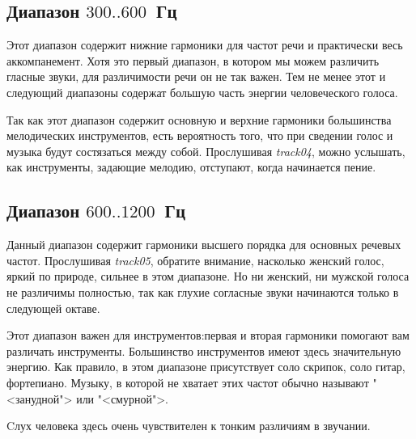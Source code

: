 \documentclass{beamer}
\begin{document}
\subsection{Диапазон $300..600$~Гц}
\begin{frame}
Этот диапазон содержит нижние гармоники для частот речи и практически весь аккомпанемент. Хотя это первый диапазон, в котором мы можем различить гласные звуки, для различимости речи он не так важен. Тем не менее этот и следующий диапазоны содержат большую часть энергии человеческого голоса.

Так как этот диапазон содержит основную и верхние гармоники большинства мелодических инструментов, есть вероятность того, что при сведении голос и музыка будут состязаться между собой. Прослушивая \emph{track04}, можно услышать, как инструменты, задающие мелодию, отступают, когда начинается пение. 

\end{frame}

\subsection{Диапазон $600..1200$~Гц}
\begin{frame}
Данный диапазон содержит гармоники высшего порядка для основных речевых частот. Прослушивая \emph{track05}, обратите внимание, насколько женский голос, яркий по природе, сильнее в этом диапазоне. Но ни женский, ни мужской голоса не различимы полностью, так как глухие согласные звуки начинаются только в следующей октаве.

Этот диапазон важен для инструментов:первая и вторая гармоники помогают вам различать инструменты. Большинство инструментов имеют здесь значительную энергию. Как правило, в этом диапазоне присутствует соло скрипок, соло гитар, фортепиано. Музыку, в которой не хватает этих частот обычно называют "<занудной"> или "<смурной">.

Cлух человека здесь очень чувствителен к тонким различиям в звучании.

\end{frame}
\end{document}
